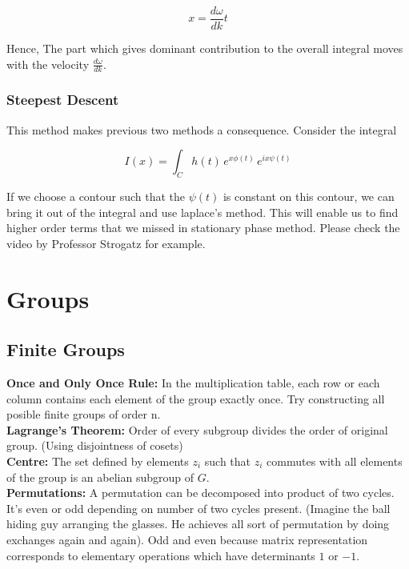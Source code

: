 \documentclass{report}
\begin{document}
$$x = \frac{d\omega}{dk} t$$

\noindent Hence, The part which gives dominant contribution to the overall integral moves with the velocity $\frac{d\omega}{dk}$.

\subsection{Steepest Descent}
This method makes previous two methods a consequence. Consider the integral 

$$I(x) = \int_{C}h(t)\, e^{x\phi(t)}\, e^{ix\psi(t)}$$

\noindent If we choose a contour such that the $\psi(t)$ is constant on this contour, we can bring it out of the integral and use laplace's method. This will enable us to find higher order terms that we missed in stationary phase method. Please check the video by Professor Strogatz for example.\\

\chapter{Groups}

\section{Finite Groups}

\noindent\textbf{Once and Only Once Rule:} In the multiplication table, each row or each column contains each element of the group exactly once. Try constructing all posible finite groups of order n.\\

\noindent\textbf{Lagrange's Theorem:} Order of every subgroup divides the order of original group. (Using disjointness of cosets)\\

\noindent\textbf{Centre:} The set defined by elements $z_i$ such that $z_i$ commutes with all elements of the group is an abelian subgroup of $G$.\\

\noindent\textbf{Permutations:} A permutation can be decomposed into product of two cycles. It's even or odd depending on number of two cycles present. (Imagine the ball hiding guy arranging the glasses. He achieves all sort of permutation by doing exchanges again and again). Odd and even because matrix representation corresponds to elementary operations which have determinants $1$ or $-1$.\\
\end{document}
